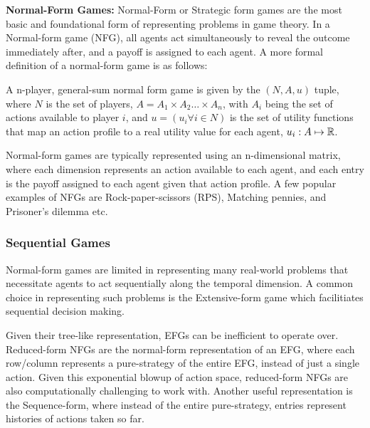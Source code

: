 \textbf{Normal-Form Games:}
Normal-Form or Strategic form games are the most basic and foundational form of representing
problems in game theory.
In a Normal-form game (NFG), all agents act simultaneously to reveal the outcome immediately after,
and a payoff is assigned to each agent.
A more formal definition of a normal-form game is as follows:

\begin{definition}

	A n-player, general-sum normal form game
	is given by the $(N, A, u)$ tuple, where $N$ is the set of players, $A = A_1 \times A_2 \ldots
		\times A_n$, with $A_i$ being the set of actions available to player $i$, and $u = (u_i \forall i
		\in N)$ is the set of utility functions that map an action profile to a real utility value for each
	agent, $u_i: A \mapsto \mathbb{R}$.

\end{definition}

Normal-form games are typically represented using an n-dimensional matrix, where each dimension
represents an action available to each agent, and each entry is the payoff assigned to each agent
given that action profile.
A few popular examples of NFGs are Rock-paper-scissors (RPS), Matching pennies, and Prisoner's
dilemma etc.

\subsubsection*{Sequential Games} Normal-form games are limited in
representing many real-world problems that necessitate agents to act sequentially along the
temporal dimension.
A common choice in representing such problems is the Extensive-form game which facilitiates
sequential decision making.

\begin{definition}
\end{definition}

Given their tree-like representation, EFGs can be inefficient to operate over.
Reduced-form NFGs are the normal-form representation of an EFG, where each row/column represents a
pure-strategy of the entire EFG, instead of just a single action.
Given this exponential blowup of action space, reduced-form NFGs are also computationally
challenging to work with.
Another useful representation is the Sequence-form, where instead of the entire pure-strategy,
entries represent histories of actions taken so far.

